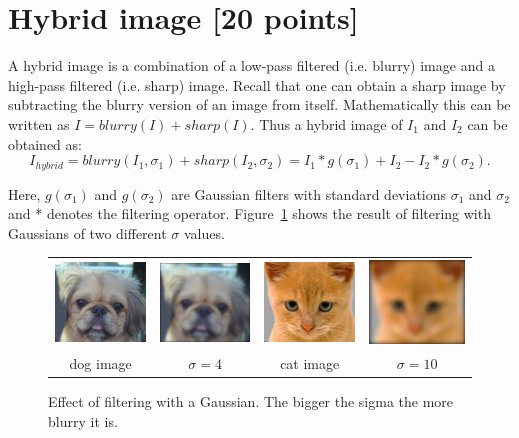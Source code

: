 \documentclass[10pt,letterpaper]{article}
\begin{document}
\newpage

\section{Hybrid image [20 points]}
A hybrid image is a combination of a low-pass filtered (i.e. blurry) image and a high-pass filtered (i.e. sharp) image. Recall that one can obtain a sharp image by subtracting the blurry version of an image from itself. Mathematically this can be written as $I = blurry(I) + sharp(I)$. Thus a hybrid image of $I_1$ and $I_2$ can be obtained as: 
\begin{equation}\label{eq:hybrid}
	I_{hybrid} = blurry(I_1, \sigma_1) + sharp(I_2, \sigma_2) = I_1 * g(\sigma_1) + I_2 - I_2*g(\sigma_2).
\end{equation}

Here, $g(\sigma_1)$ and $g(\sigma_2)$ are Gaussian filters with standard deviations $\sigma_1$ and $\sigma_2$ and * denotes the filtering operator. Figure~\ref{fig:blur} shows the result of filtering with Gaussians of two different $\sigma$ values.


\begin{figure}[h]
\begin{tabular}{cccc}
\includegraphics[width=0.23\linewidth]{./output/dog.jpg} &
\includegraphics[width=0.23\linewidth]{./output/dog-blurry-4.jpg} & 
\includegraphics[width=0.23\linewidth]{./output/cat.jpg} &
\includegraphics[width=0.23\linewidth]{./output/cat-blurry-10.jpg}\\
dog image & $\sigma=4$ & cat image & $\sigma=10$ \\
\end{tabular}
\caption{\label{fig:blur} Effect of filtering with a Gaussian. The bigger the sigma the more blurry it is.}
\end{figure}
\end{document}
